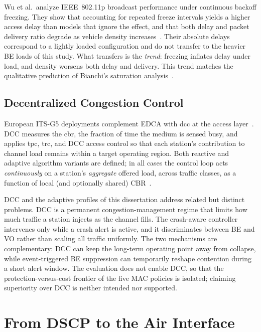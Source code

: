 Wu et al.\ analyze IEEE~802.11p broadcast performance under continuous backoff freezing.
They show that accounting for repeated freeze intervals yields a higher access delay than models that ignore the effect, and that both delay and packet delivery ratio degrade as vehicle density increases~\cite{Continuous_Backoff_Freezing_Li}.
Their absolute delays correspond to a lightly loaded configuration and do not transfer to the heavier BE loads of this study.
What transfers is the \emph{trend}: freezing inflates delay under load, and density worsens both delay and delivery. This trend matches the qualitative prediction of Bianchi's saturation analysis~\cite{bianchi2000DCF}.

\subsection{Decentralized Congestion Control}
\label{sec:bg:dcc}

European ITS-G5 deployments complement EDCA with \gls{dcc} at the access layer~\cite{etsi_dcc_2018}.
DCC measures the \gls{cbr}, the fraction of time the medium is sensed busy, and applies \gls{tpc}, \gls{trc}, and DCC access control so that each station's contribution to channel load remains within a target operating region.
Both reactive and adaptive algorithm variants are defined; in all cases the control loop acts \emph{continuously} on a station's \emph{aggregate} offered load, across traffic classes, as a function of local (and optionally shared) CBR~\cite{etsi_dcc_2018}.

DCC and the adaptive profiles of this dissertation address related but distinct problems.
DCC is a permanent congestion-management regime that limits how much traffic a station injects as the channel fills.
The crash-aware controller intervenes only while a crash alert is active, and it discriminates between BE and VO rather than scaling all traffic uniformly.
The two mechanisms are complementary: DCC can keep the long-term operating point away from collapse, while event-triggered BE suppression can temporarily reshape contention during a short alert window.
The evaluation does not enable DCC, so that the protection-versus-cost frontier of the five MAC policies is isolated; claiming superiority over DCC is neither intended nor supported.

\section{From DSCP to the Air Interface}
\label{sec:bg:dscp}

